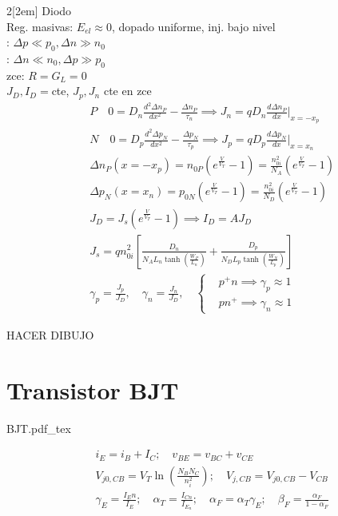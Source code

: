 \documentclass[leqno]{article}
\newcommand{\incfig}[1]{%
\begin{center}
\def\svgwidth{0.9\columnwidth}
{#1.pdf_tex}
\end{center}
}
\begin{document}
\begin{multicols}{2}[\columnsep2em]
Diodo\\
Reg. masivas: $E_{el} \approx 0$, dopado uniforme, inj. bajo nivel\\
: $ \Delta p \ll p_0, \Delta n \gg n_0$\\
: $ \Delta n \ll n_0, \Delta p \gg p_0$ \\
zce: $R = G_L = 0$ \\
$J_D, I_D = $cte, $J_p, J_n$ cte en zce
\begin{align*}
& \boxed{P} \quad  0 = D_n \frac{d^2\Delta n_P}{dx^2} - \frac{\Delta n_P}{\tau_n} \implies J_n = qD_n \frac{d\Delta n_P}{dx}|_{x= -x_p}\\
& \boxed{N} \quad  0 = D_p \frac{d^2\Delta p_N}{dx^2} - \frac{\Delta p_N}{\tau_p} \implies J_p = qD_p \frac{d\Delta p_N}{dx}|_{x= x_n}\\
&\Delta n_P(x=-x_p) = n_{0P} (e ^{\frac{V}{V_T}} -1) = \frac{n_{0i}^2}{N_A}(e ^{\frac{V}{V_T}}-1)\\
&\Delta p_N(x=x_n) = p_{0N} (e ^{\frac{V}{V_T}} -1) = \frac{n_{0i}^2}{N_D}(e ^{\frac{V}{V_T}}-1)\\
&J_D = J_s (e ^{\frac{V}{V_T}} -1) \implies I_D = AJ_D\\
&J_s = q n^2_{0i} \left[ \frac{D_n}{N_A L_n \tanh \left( \frac{W_P}{L_n} \right)} + \frac{D_p}{N_DL_p \tanh \left( \frac{W_N}{L_p} \right)} \right]\\
&\gamma _{p} = \frac{J_p}{J_D}, \quad \gamma _{n} = \frac{J_n}{J_D}, \quad \begin{cases}
&p^+n \implies \gamma _p \approx 1\\
&pn^+ \implies \gamma _n \approx 1
\end{cases}
\end{align*}

HACER DIBUJO

\section{Transistor BJT}

\incfig{BJT}

\begin{align*}
&i_E = i_B + I_C; \quad v_{BE} = v_{BC} + v_{CE}\\
& V_{j0, CB} = V_T \ln \left( \frac{N_BN_C}{n_i^2} \right); \quad  V_{j, CB} = V_{j0, CB} - V_{CB}\\
&\gamma _E = \frac{I_En}{I_E}; \quad \alpha_T = \frac{I_{Cn}}{I_{E_n}}; \quad \alpha_F = \alpha_T \gamma _E; \quad \beta_F = \frac{\alpha_F}{1- \alpha_F}
\end{align*}






\end{multicols}
\end{document}
